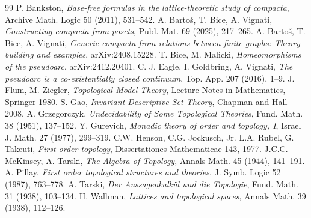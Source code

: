 \documentclass[12pt]{amsart}
\theoremstyle{plain}
\begin{document}
\begin{thebibliography}{99}
 P. Bankston, \emph{Base-free formulas in the lattice-theoretic study of compacta}, Archive Math. Logic 50 (2011), 531--542.  
 A. Barto\v s, T. Bice, A. Vignati,  \emph{Constructing compacta from posets}, Publ. Mat. 69 (2025), 217--265.
 A. Barto\v s, T. Bice, A. Vignati, \emph{Generic compacta from relations between finite graphs: Theory building and examples}, arXiv:2408.15228.
 T. Bice, M. Malicki, \emph{Homeomorphisms of the pseudoarc}, arXiv:2412.20401.
 C. J. Eagle, I. Goldbring, A. Vignati, \emph{The pseudoarc is a co-existentially closed continuum}, Top. App. 207 (2016), 1--9.
 J. Flum, M. Ziegler, \emph{Topological Model Theory}, Lecture Notes in Mathematics, Springer 1980. 
 S. Gao, \emph{Invariant Descriptive Set Theory}, Chapman and Hall 2008.
 A. Grzegorczyk,  \emph{Undecidability of Some Topological Theories}, Fund. Math. 38 (1951), 137--152.
 Y. Gurevich, \emph{Monadic theory of order and topology, I}, Israel J. Math. 27 (1977), 299--319.
  C.W. Henson, C.G. Jockusch, Jr. L.A. Rubel, G. Takeuti,  \emph{First order topology}, Dissertationes Mathematicae 143, 1977. 
 J.C.C. McKinsey, A. Tarski,  \emph{The Algebra of Topology}, Annals Math. 45 (1944), 141--191.
 A. Pillay, \emph{First order topological structures and theories}, J. Symb. Logic 52 (1987), 763--778.
 A. Tarski, \emph{Der Aussagenkalkül und die Topologie}, Fund. Math. 31 (1938), 103--134.
 H. Wallman, \emph{Lattices and topological spaces}, Annals Math.  39 (1938), 112--126.

\end{thebibliography}  
\end{document}
